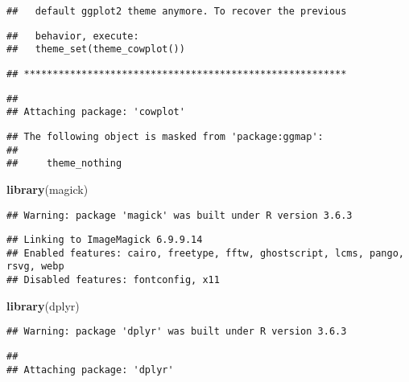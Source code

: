 \documentclass[
]{article}
\newenvironment{Shaded}{\begin{snugshade}}{\end{snugshade}}
\newcommand{\KeywordTok}[1]{\textcolor[rgb]{0.13,0.29,0.53}{\textbf{#1}}}
\newcommand{\NormalTok}[1]{#1}
\begin{document}
\begin{verbatim}
##   default ggplot2 theme anymore. To recover the previous
\end{verbatim}

\begin{verbatim}
##   behavior, execute:
##   theme_set(theme_cowplot())
\end{verbatim}

\begin{verbatim}
## ********************************************************
\end{verbatim}

\begin{verbatim}
## 
## Attaching package: 'cowplot'
\end{verbatim}

\begin{verbatim}
## The following object is masked from 'package:ggmap':
## 
##     theme_nothing
\end{verbatim}

\begin{Shaded}
\begin{Highlighting}[]
\KeywordTok{library}\NormalTok{(magick)}
\end{Highlighting}
\end{Shaded}

\begin{verbatim}
## Warning: package 'magick' was built under R version 3.6.3
\end{verbatim}

\begin{verbatim}
## Linking to ImageMagick 6.9.9.14
## Enabled features: cairo, freetype, fftw, ghostscript, lcms, pango, rsvg, webp
## Disabled features: fontconfig, x11
\end{verbatim}

\begin{Shaded}
\begin{Highlighting}[]
\KeywordTok{library}\NormalTok{(dplyr)}
\end{Highlighting}
\end{Shaded}

\begin{verbatim}
## Warning: package 'dplyr' was built under R version 3.6.3
\end{verbatim}

\begin{verbatim}
## 
## Attaching package: 'dplyr'
\end{verbatim}
\end{document}
